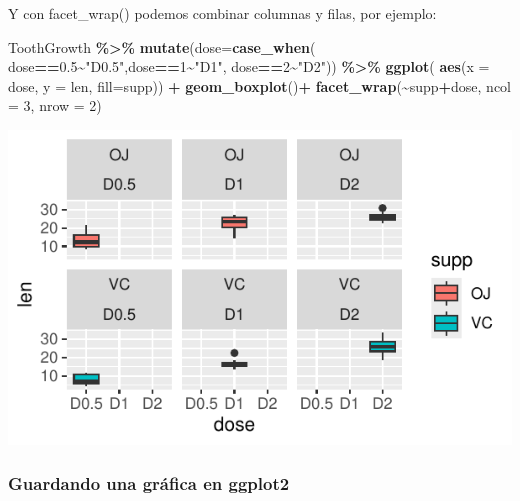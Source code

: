 \documentclass[
]{book}
\newenvironment{Shaded}{\begin{snugshade}}{\end{snugshade}}
\newcommand{\AttributeTok}[1]{\textcolor[rgb]{0.13,0.29,0.53}{#1}}
\newcommand{\DecValTok}[1]{\textcolor[rgb]{0.00,0.00,0.81}{#1}}
\newcommand{\FloatTok}[1]{\textcolor[rgb]{0.00,0.00,0.81}{#1}}
\newcommand{\FunctionTok}[1]{\textcolor[rgb]{0.13,0.29,0.53}{\textbf{#1}}}
\newcommand{\NormalTok}[1]{#1}
\newcommand{\SpecialCharTok}[1]{\textcolor[rgb]{0.81,0.36,0.00}{\textbf{#1}}}
\newcommand{\StringTok}[1]{\textcolor[rgb]{0.31,0.60,0.02}{#1}}
\begin{document}
\newpage

Y con facet\_wrap() podemos combinar columnas y filas, por ejemplo:\\

\begin{Shaded}
\begin{Highlighting}[]
\NormalTok{ToothGrowth }\SpecialCharTok{\%\textgreater{}\%}  \FunctionTok{mutate}\NormalTok{(}\AttributeTok{dose=}\FunctionTok{case\_when}\NormalTok{(}
\NormalTok{  dose}\SpecialCharTok{==}\FloatTok{0.5}\SpecialCharTok{\textasciitilde{}}\StringTok{"D0.5"}\NormalTok{,dose}\SpecialCharTok{==}\DecValTok{1}\SpecialCharTok{\textasciitilde{}}\StringTok{"D1"}\NormalTok{, dose}\SpecialCharTok{==}\DecValTok{2}\SpecialCharTok{\textasciitilde{}}\StringTok{"D2"}\NormalTok{)) }\SpecialCharTok{\%\textgreater{}\%} \FunctionTok{ggplot}\NormalTok{(}
    \FunctionTok{aes}\NormalTok{(}\AttributeTok{x =}\NormalTok{ dose, }\AttributeTok{y =}\NormalTok{ len, }\AttributeTok{fill=}\NormalTok{supp)) }\SpecialCharTok{+}  \FunctionTok{geom\_boxplot}\NormalTok{()}\SpecialCharTok{+} 
  \FunctionTok{facet\_wrap}\NormalTok{(}\SpecialCharTok{\textasciitilde{}}\NormalTok{supp}\SpecialCharTok{+}\NormalTok{dose, }\AttributeTok{ncol =} \DecValTok{3}\NormalTok{, }\AttributeTok{nrow =} \DecValTok{2}\NormalTok{)}
\end{Highlighting}
\end{Shaded}

\begin{center}\includegraphics{R_Manual_files/figure-latex/unnamed-chunk-222-1} \end{center}

\subsubsection{Guardando una gráfica en ggplot2}\label{guardando-una-gruxe1fica-en-ggplot2}
\end{document}
